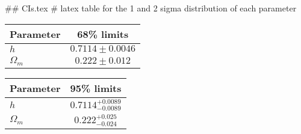 ## CIs.tex
# latex table for the 1 and 2 sigma distribution of each parameter

\begin{tabular} { l  c}
 Parameter &  68\% limits\\
\hline
{\boldmath$h              $} & $0.7114\pm 0.0046          $\\
{\boldmath$\Omega_m       $} & $0.222\pm 0.012            $\\
\hline
\end{tabular}

\begin{tabular} { l  c}
 Parameter &  95\% limits\\
\hline
{\boldmath$h              $} & $0.7114^{+0.0089}_{-0.0089}$\\
{\boldmath$\Omega_m       $} & $0.222^{+0.025}_{-0.024}   $\\
\hline
\end{tabular}
